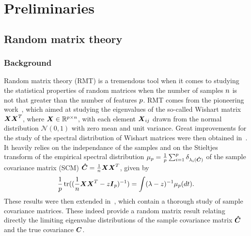 \documentclass{article}
\theoremstyle{plain}
\theoremstyle{definition}
\theoremstyle{remark}
\begin{document}
\section{Preliminaries}

\subsection{Random matrix theory}
\subsubsection{Background}
Random matrix theory (RMT) is a tremendous tool when it comes to studying the statistical properties of random matrices when the number of samples $n$ is not that greater than the number of features $p$.
%
RMT comes from the pioneering work~\cite{wishart1928generalised}, which aimed at studying the eigenvalues of the so-called Wishart matrix $\boldsymbol{X}\boldsymbol{X}^T$, where $\boldsymbol{X}\in\mathbb{R}^{p\times n}$, with  each element $\boldsymbol{X}_{ij}$ drawn from the normal distribution $\mathcal{N}(0,1)$ with zero mean and unit variance.
Great improvements for the study of the spectral distribution of Wishart matrices were then obtained in~\cite{marchenko1967distribution}.
It heavily relies on the independance of the samples and on the Stieltjes transform of the empirical spectral distribution $\mu_{p}=\frac1{p}\sum_{i=1}^{p}\delta_{\lambda_i(\boldsymbol{\hat{C}})}$ of the sample covariance matrix (SCM) $\boldsymbol{\hat{C}}=\frac1{n}\boldsymbol{X}\boldsymbol{X}^T$, given by
\begin{equation*}
    \frac1{p}\operatorname{tr}((\frac1{n}\boldsymbol{X}\boldsymbol{X}^T - z\boldsymbol{I}_{p})^{-1})
    =
    \int (\lambda-z)^{-1}\mu_{p}(dt).
\end{equation*}
These results were then extended in~\cite{silverstein1995empirical,bai1998no}, which contain a thorough study of sample covariance matrices.
These indeed provide a random matrix result relating directly the limiting eigenvalue distributions of the sample covariance matrix $\boldsymbol{\hat{C}}$ and the true covariance $\boldsymbol{C}$.
\end{document}
